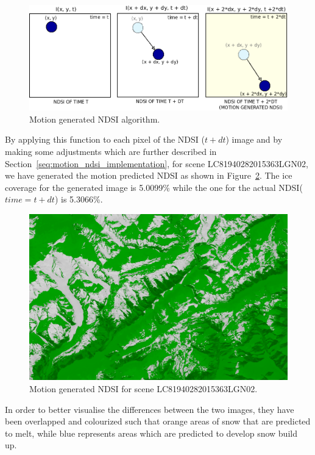 \documentclass[12pt, a4paper]{report}
\begin{document}
	\begin{figure}[h!]
		\centering
		\includegraphics[scale=0.5]{../images/motion_generated_schema.png}
		\caption{Motion generated NDSI algorithm.}
		\label{fig:motion_generated_schema}
	\end{figure}

	\par By applying this function to each pixel of the NDSI (\(t + dt\)) image and by making some adjustments which are further described in Section~\ref{seq:motion_ndsi_implementation}, for scene LC81940282015363LGN02, we have generated the motion predicted NDSI as shown in Figure~\ref{fig:motion_predicted_image}. The ice coverage for the generated image is 5.0099\% while the one for the actual NDSI(\(time=t+dt\)) is 5.3066\%.
	
	\begin{figure}[h!]
	\centering
	\includegraphics[width=\linewidth]{../images/LC81940282015363LGN02_motion_predicted.png}
	\caption{Motion generated NDSI for scene LC81940282015363LGN02.}
	\label{fig:motion_predicted_image}
	\end{figure}

	In order to better visualise the differences between the two images, they have been overlapped and colourized such that orange areas of snow that are predicted to melt, while blue represents areas which are predicted to develop snow build up.
	
\end{document}
